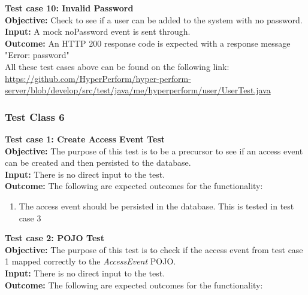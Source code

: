 \documentclass[11pt,a4paper]{article}
\begin{document}
\textbf{Test case 10: Invalid Password} \\
\textbf{Objective: } Check to see if a user can be added to the system with no password. \\
\textbf{Input: }  A mock noPassword event is sent through.\\
\textbf{Outcome: } An HTTP 200 response code is expected with a response message "Error: password" \\

All these test cases above can be found on the following link: \url{https://github.com/HyperPerform/hyper-perform-server/blob/develop/src/test/java/me/hyperperform/user/UserTest.java}

\subsubsection{Test Class 6}	
\textbf{Test case 1: Create Access Event Test} \\
\textbf{Objective: } The purpose of this test is to be a precursor to see if an access event can be created and then persisted to the database. \\
\textbf{Input: } There is no direct input to the test. \\
\textbf{Outcome: } The following are expected outcomes for the functionality: 
\begin{enumerate}
	\item The access event should be persisted in the database. This is tested in test case 3\\
\end{enumerate}
\noindent
\textbf{Test case 2: POJO Test} \\
\textbf{Objective: } The purpose of this test is to check if the access event from test case 1 mapped correctly to the \textit{AccessEvent} POJO. \\
\textbf{Input: } There is no direct input to the test. \\
\textbf{Outcome: } The following are expected outcomes for the functionality:
\end{document}
